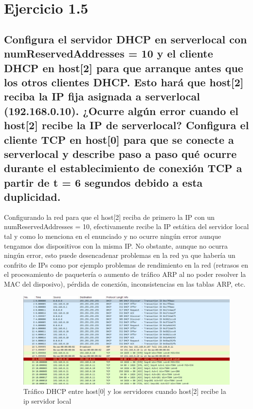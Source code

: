 \section{Ejercicio 1.5}

\subsection{Configura el servidor DHCP en serverlocal con numReservedAddresses = 10 y el cliente DHCP en host[2]
para que arranque antes que los otros clientes DHCP. Esto hará que host[2] reciba la IP fija asignada a
serverlocal (192.168.0.10). ¿Ocurre algún error cuando el host[2] recibe la IP de serverlocal? Configura el
cliente TCP en host[0] para que se conecte a serverlocal y describe paso a paso qué ocurre durante el
establecimiento de conexión TCP a partir de t = 6 segundos debido a esta duplicidad.}

Configurando la red para que el host[2] reciba de primero la IP con un numReservedAddresses = 10, efectivamente recibe la IP estática del servidor local tal y como lo menciona en el enunciado y no ocurre ningún error aunque tengamos dos dispositivos con la misma IP. No obstante, aunque no ocurra ningún error, esto puede desencadenar problemas en la red ya que habería un confrito de IPs como por ejemplo problemas de rendimiento en la red (retrasos en el procesamiento de paquetería o aumento de tráfico ARP al no poder resolver la MAC del disposivo),  pérdida de conexión, inconsistencias en las tablas ARP, etc.

\begin{figure}[!ht]
    \centering
    \includegraphics[width=135mm, scale=0.75]{imaxes/captura_ejer1_5.png}
    \caption{Tráfico DHCP entre host[0] y los servidores cuando host[2] recibe la ip servidor local}
    \label{fig:captura2_host0}
\end{figure}

